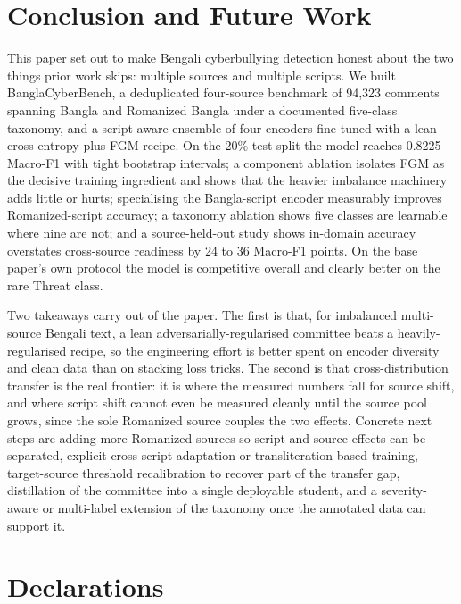 \documentclass[11pt,a4paper]{article}
\def\emph#1{#1}%
\newcommand{\bench}{BanglaCyberBench}
\begin{document}
\section{Conclusion and Future Work}
\label{sec:conclusion}

This paper set out to make Bengali cyberbullying detection honest about the two things prior work skips: multiple sources and multiple scripts. We built \bench{}, a deduplicated four-source benchmark of 94{,}323 comments spanning Bangla and Romanized Bangla under a documented five-class taxonomy, and a script-aware ensemble of four encoders fine-tuned with a lean cross-entropy-plus-FGM recipe. On the 20\% test split the model reaches 0.8225 Macro-F1 with tight bootstrap intervals; a component ablation isolates FGM as the decisive training ingredient and shows that the heavier imbalance machinery adds little or hurts; specialising the Bangla-script encoder measurably improves Romanized-script accuracy; a taxonomy ablation shows five classes are learnable where nine are not; and a source-held-out study shows in-domain accuracy overstates cross-source readiness by 24 to 36 Macro-F1 points. On the base paper's own protocol the model is competitive overall and clearly better on the rare \emph{Threat} class.

Two takeaways carry out of the paper. The first is that, for imbalanced multi-source Bengali text, a lean adversarially-regularised committee beats a heavily-regularised recipe, so the engineering effort is better spent on encoder diversity and clean data than on stacking loss tricks. The second is that cross-distribution transfer is the real frontier: it is where the measured numbers fall for source shift, and where script shift cannot even be measured cleanly until the source pool grows, since the sole Romanized source couples the two effects. Concrete next steps are adding more Romanized sources so script and source effects can be separated, explicit cross-script adaptation or transliteration-based training, target-source threshold recalibration to recover part of the transfer gap, distillation of the committee into a single deployable student, and a severity-aware or multi-label extension of the taxonomy once the annotated data can support it.

\section*{Declarations}
\end{document}
